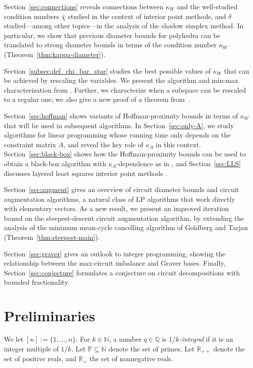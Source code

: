 \documentclass[11pt, a4paper]{article}
\newcommand{\Le}{\kappa}
\newcommand{\1}{\mathbbm{1}}
\newcommand{\primes}{\mathbb{P}}
\newcommand{\Q}{\mathbb{Q}}
\theoremstyle{case}
\newcommand{\R}{\mathbb{R}}
\newcommand{\N}{\mathbb{N}}
\begin{document}
Section~\ref{sec:connections} reveals connections between $\Le_W$ and the well-studied condition numbers $\bar\chi$ studied in the context of interior point methods, and $\delta$ studied---among other topics---in the analysis of the shadow simplex method. In particular, we show that previous diameter bounds for polyhedra can be translated to strong diameter bounds in terms of the condition number $\Le_W$ (Theorem~\ref{thm:kappa-diameter}).

Section~\ref{subsec:def_chi_bar_star} studies the best possible values of $\Le_{W}$ that can be achieved by rescaling the variables. We present the algorithm and min-max characterization from \cite{DHNV20}. Further, we characterize when a subspace can be rescaled to a regular one; we also give a new proof of a theorem from~\cite{Lee89}.

Section~\ref{sec:hoffman} shows variants of Hoffman-proximity bounds in terms of $\Le_W$ that will be used in  subsequent algorithms. In Section~\ref{sec:only-A}, we study algorithms for linear programming whose running time only depends on the constraint matrix $A$, and reveal the key role of $\Le_A$ in this context. Section~\ref{sec:black-box} shows how the Hoffman-proximity bounds can be used to obtain a black-box algorithm with $\Le_A$-dependence as in \cite{DadushNV20}, and Section~\ref{sec:LLS} discusses layered least squares interior point methods \cite{DHNV20,Vavasis1996}.

Section~\ref{sec:augment} gives an overview of circuit diameter bounds and circuit augmentation algorithms, a natural class of LP algorithms that work directly with elementary vectors. As a new result, we present an improved iteration bound on the steepest-descent circuit augmentation algorithm, by extending the analysis of the minimum mean-cycle cancelling algorithm of Goldberg and Tarjan (Theorem~\ref{thm:steepest-main}).

Section~\ref{sec:graver} gives an outlook to integer programming, showing the relationship between the max-circuit imbalance and Graver bases. Finally, Section~\ref{sec:conjecture} formulates a conjecture on circuit decompositions with bounded fractionality.
 

\section{Preliminaries}\label{sec:prelim}

We let $[n] := \{1, \ldots, n\}$. For $k\in\N$, a number $q\in\Q$ is \emph{$1/k$-integral} if it is an integer multiple of $1/k$. Let $\primes\subseteq\N$ denote the set of primes.
Let $\R_{++}$ denote the set of positive reals, and $\R_+$ the set of nonnegative reals. 
  
\end{document}
